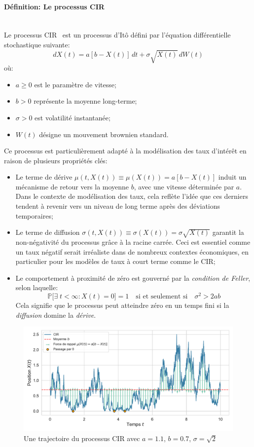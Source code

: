 \paragraph{Définition: Le processus \acl{CIR}}\mbox{}\\
Le processus \ac{CIR}~\cite{cox1985} est un processus d'Itô défini par l'équation différentielle stochastique suivante:
\begin{equation}
    dX(t) = a[b - X(t)]\,dt + \sigma \sqrt{X(t)}\,dW(t)
\end{equation}\label{cir_eq}
où:
\begin{itemize}
    \item $a \geq 0$ est le paramètre de vitesse;
    \item $b > 0$ représente la moyenne long-terme;
    \item $\sigma > 0$ est volatilité instantanée;
    \item $W(t)$ désigne un mouvement brownien standard.
\end{itemize}
Ce processus est particulièrement adapté à la modélisation des taux d'intérêt en raison de plusieurs propriétés clés:
\begin{itemize}
    \item Le terme de dérive $\mu(t, X(t)) \equiv \mu(X(t))= a[b - X(t)]$ induit un mécanisme de retour vers la moyenne $b$, avec une vitesse déterminée par $a$. Dans le contexte de modélisation des taux, cela reflète l'idée que ces derniers tendent à revenir vers un niveau de long terme après des déviations temporaires;
    \item Le terme de diffusion $\sigma(t, X(t))\equiv \sigma(X(t)) = \sigma \sqrt{X(t)}$ garantit la non-négativité du processus grâce à la racine carrée. Ceci est essentiel comme un taux négatif serait irréaliste dans de nombreux contextes économiques, en particulier pour les modèles de taux à court terme comme le CIR;
    \item Le comportement à proximité de zéro est gouverné par la \textit{condition de Feller}, selon laquelle:
    \[
    \mathds{P} \Big[ \exists\;t < \infty:X(t) = 0 \Big] = 1 \quad \text{si et seulement si} \quad \sigma^2 > 2ab
    \]
    Cela signifie que le processus peut atteindre zéro en un temps fini si la \textit{diffusion} domine la \textit{dérive}.
\end{itemize}
\begin{figure}[htb]
    \centering
    \includegraphics[width=0.9\linewidth]{img/intro/path_cir_combined.pdf}
    \caption{Une trajectoire du processus \acs{CIR} avec $a=1.1$, $b=0.7$, $\sigma=\sqrt{2}$}\label{fig:TrajCIR}
\end{figure}
